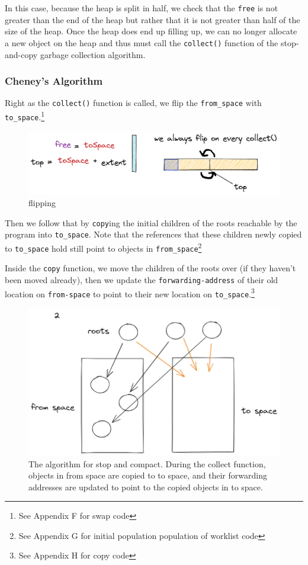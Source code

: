 \documentclass[index]{subfiles}
\begin{document}
In this case, because the heap is split in half, we check that the \verb+free+ is not greater than the end of the heap but rather that it is not greater than half of the size of the heap. Once the heap does end up filling up, we can no longer allocate a new object on the heap and thus must call the \verb+collect()+ function of the stop-and-copy garbage collection algorithm.

\subsubsection{Cheney's Algorithm}

Right as the \verb+collect()+ function is called, we flip the \verb+from_space+ with \verb+to_space+.\footnote{See Appendix F for swap code}

\begin{figure}[H]
    \centering
    \includegraphics[scale=0.25]{pics/flipping.png}
    \caption{flipping}
\end{figure}

Then we follow that by \verb+copy+ing the initial children of the roots reachable by the program into \verb+to_space+. Note that the references that these children newly copied to \verb+to_space+ hold still point to objects in \verb+from_space+\footnote{See Appendix G for initial population population of worklist code}

Inside the \verb+copy+ function, we move the children of the roots over (if they haven't been moved already), then we update the \verb+forwarding-address+ of their old location on \verb+from-space+ to point to their new location on \verb+to_space+.\footnote{See Appendix H for copy code}

\begin{figure}[H]
    \centering
    \includegraphics[scale=0.3]{pics/visualization-of-worklist.png}
    \caption{The algorithm for stop and compact. During the collect function, objects in from space are copied to to space, and their forwarding addresses are updated to point to the copied objects in to space.}
\end{figure}
\end{document}
